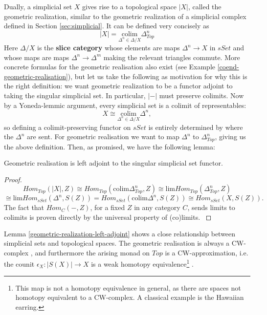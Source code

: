Dually, a simplicial set $X$ gives rise to a topological space $|X|$, called the geometric realization, similar to the geometric realization of a simplicial complex defined in Section \ref{sec:simplicial}. It can be defined very concisely as
\[|X|=\underset{\Delta^n\in \Delta/X}{\text{colim}} \Delta^n_{Top}\]  Here $\Delta/X$ is the \textbf{slice category} whose elements are maps $\Delta^n\rightarrow X$ in $sSet$ and whose maps are maps $\Delta^n\rightarrow \Delta^m$ making the relevant triangles commute. More concrete formulas for the geometric realisation also exist (see Example \ref{coend-geometric-realisation}), but let us take the following as motivation for why this is the right definition: we want geometric realization to be a functor adjoint to taking the singular simplicial set. In particular, $|-|$ must preserve colimits. Now by a Yoneda-lemmic argument, every simplicial set is a colimit of representables: $$X\cong \underset{\Delta^n\in \Delta/X}{\text{colim}}\Delta^n,$$ so defining a colimit-preserving functor on $sSet$ is entirely determined by where the $\Delta^n$ are sent. For geometric realisation we want to map $\Delta^n$ to $ \Delta^n_{Top}$, giving us the above definition. Then, as promised, we have the following lemma:
\begin{lemma}\label{geometric-realization-left-adjoint}
Geometric realisation is left adjoint to the singular simplicial set functor.
\end{lemma}
\begin{proof}
    \[Hom_{Top}(|X|,Z)\cong  Hom_{Top}(\text{colim}\Delta^n_{Top},Z)\cong \text{lim}Hom_{Top}(\Delta^n_{Top},Z)\]
    \[\cong\text{lim}Hom_{sSet}(\Delta^n,S(Z))=Hom_{sSet}(\text{colim}\Delta^n,S(Z))\cong Hom_{sSet}(X,S(Z)). \]
    The fact that $Hom_C(-,Z)$, for a fixed $Z$ in any category $C$, sends limits to colimits is proven directly by the universal property of (co)limits. \cite{Land}\end{proof}


Lemma \ref{geometric-realization-left-adjoint} shows a close relationship between simplicial sets and topological spaces. The geometric realisation is always a CW-complex \cite{Land}, and furthermore the arising monad on $Top$ is a CW-approximation, i.e. the counit $\epsilon_X:|S(X)|\rightarrow X$ is a weak homotopy equivalence\footnote{This map is not a homotopy equivalence in general, as there are spaces not homotopy equivalent to a CW-complex. A classical example is the Hawaiian earring. 
} \cite{May}.

